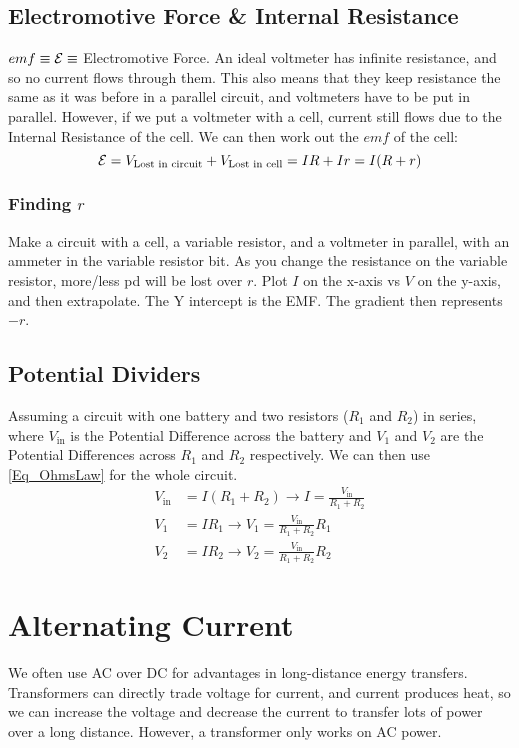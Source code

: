 \section{Electromotive Force \& Internal Resistance}
\(emf \equiv \mathcal{E} \equiv \) Electromotive Force.
An ideal voltmeter has infinite resistance, and so no current flows through them. This also means that they keep resistance the same as it was before in a parallel circuit, and voltmeters have to be put in parallel. However, if we put a voltmeter with a cell, current still flows due to the Internal Resistance of the cell. We can then work out the \(emf\) of the cell:
\[ \mathcal{E} = V_{\text{Lost in circuit}} + V_{\text{Lost in cell}} = IR + Ir = I(R+r) \]

\subsection{Finding \(r\)}
\begin{enumerate}
	\ii Make a circuit with a cell, a variable resistor, and a voltmeter in parallel, with an ammeter in the variable resistor bit.
	\ii As you change the resistance on the variable resistor, more/less pd will be lost over \(r\).
	\ii Plot \(I\) on the x-axis vs \(V\) on the y-axis, and then extrapolate. The Y intercept is the EMF. The gradient then represents \(-r\).
\end{enumerate}


\section{Potential Dividers}
Assuming a circuit with one battery and two resistors (\(R_1\) and \(R_2\)) in series, where \(V_\text{in}\) is the Potential Difference across the battery and \(V_1\) and \(V_2\) are the Potential Differences across \(R_1\) and \(R_2\) respectively. We can then use \eqref{Eq_OhmsLaw} for the whole circuit.
\begin{align}
	V_\text{in} &= I(R_1 + R_2) \to I = \frac{V_\text{in}}{R_1 + R_2} \\
	V_1 &= IR_1 \to V_1 = \frac{V_\text{in}}{R_1+R_2}R_1 \\
	V_2 &= IR_2 \to V_2 = \frac{V_\text{in}}{R_1 + R_2}R_2
\end{align}

\chapter{Alternating Current}
We often use AC over DC for advantages in long-distance energy transfers. Transformers can directly trade voltage for current, and current produces heat, so we can increase the voltage and decrease the current to transfer lots of power over a long distance. However, a transformer only works on AC power.

